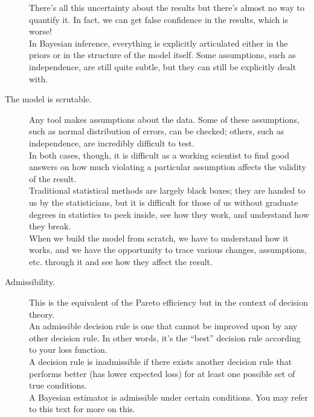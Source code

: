 \documentclass[14pt]{extarticle}
\begin{document}
\begin{description}
	There's all this uncertainty about the results but there's almost no way to quantify it. In fact, we can get false confidence in the results, which is worse! \\
	
	In Bayesian inference, everything is explicitly articulated either in the priors or in the structure of the model itself. Some assumptions, such as independence, are still quite subtle, but they can still be explicitly dealt with.

	\item[The model is scrutable.] Any tool makes assumptions about the data. Some of these assumptions, such as normal distribution of errors, can be checked;
others, such as independence, are incredibly difficult to test. \\

	In both cases, though, it is difficult as a working scientist to find good answers on how much violating a particular assumption affects the validity of the result. \\
	
	Traditional statistical methods are largely black boxes; they are handed to us by the statisticians, but it is difficult for those of us without graduate degrees in statistics to peek inside, see how they work, and understand how they break. \\
	
	When we build the model from scratch, we have to understand how it works, and we have the opportunity to trace various changes, assumptions, etc. through it and see how they affect the result.
	
	\item[Admissibility.] This is the equivalent of the Pareto efficiency but in the context of decision theory. \\
	
	An admissible decision rule is one that cannot be improved upon by any other decision rule. In other words, it's the ``best'' decision rule according to your loss function. \\
	
	A decision rule is inadmissible if there exists another decision rule that performs better (has lower expected loss) for at least one possible set of true conditions. \\
	
	A Bayesian estimator is admissible under certain conditions. You may refer to this text for more on this.

\end{description}
\end{document}
